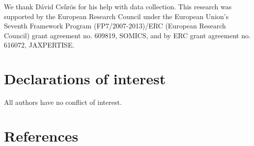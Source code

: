 \documentclass[
  english,
  man,floatsintext]{apa6}
\begin{document}
We thank Dávid Csűrös for his help with data collection. This research was supported by the European Research Council under the European Union's Seventh Framework Program (FP7/2007-2013)/ERC (European Research Council) grant agreement no. 609819, SOMICS, and by ERC grant agreement no. 616072, JAXPERTISE.

\hypertarget{declarations-of-interest}{%
\section{Declarations of interest}\label{declarations-of-interest}}

All authors have no conflict of interest.

\newpage

\hypertarget{references}{%
\section{References}\label{references}}

\begingroup
\setlength{\parindent}{-0in}
\setlength{\leftskip}{0in}
\end{document}
